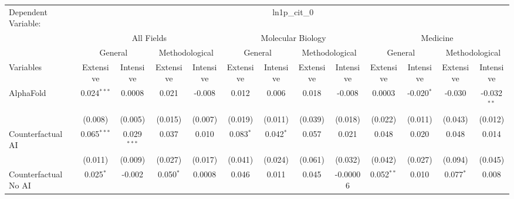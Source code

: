 \begingroup
\centering
\begin{tabular}{lcccccccccccc}
   \tabularnewline \midrule \midrule
   Dependent Variable: & \multicolumn{12}{c}{ln1p\_cit\_0}\\
 & \multicolumn{4}{c}{All Fields} & \multicolumn{4}{c}{Molecular Biology} & \multicolumn{4}{c}{Medicine} \\
\cmidrule(lr){2-5} \cmidrule(lr){6-9} \cmidrule(lr){10-13}
 & \multicolumn{2}{c}{General} & \multicolumn{2}{c}{Methodological} & \multicolumn{2}{c}{General} & \multicolumn{2}{c}{Methodological} & \multicolumn{2}{c}{General} & \multicolumn{2}{c}{Methodological} \\
\cmidrule(lr){2-3} \cmidrule(lr){4-5} \cmidrule(lr){6-7} \cmidrule(lr){8-9} \cmidrule(lr){10-11} \cmidrule(lr){12-13}
Variables & \multicolumn{1}{c}{Extensive} & \multicolumn{1}{c}{Intensive} & \multicolumn{1}{c}{Extensive} & \multicolumn{1}{c}{Intensive} & \multicolumn{1}{c}{Extensive} & \multicolumn{1}{c}{Intensive} & \multicolumn{1}{c}{Extensive} & \multicolumn{1}{c}{Intensive} & \multicolumn{1}{c}{Extensive} & \multicolumn{1}{c}{Intensive} & \multicolumn{1}{c}{Extensive} & \multicolumn{1}{c}{Intensive} \\
\cmidrule(lr){1-1}\cmidrule(lr){2-2} \cmidrule(lr){3-3} \cmidrule(lr){4-4} \cmidrule(lr){5-5} \cmidrule(lr){6-6} \cmidrule(lr){7-7} \cmidrule(lr){8-8} \cmidrule(lr){9-9} \cmidrule(lr){10-10} \cmidrule(lr){11-11} \cmidrule(lr){12-12} \cmidrule(lr){13-13}
   AlphaFold                                & 0.024$^{***}$ & 0.0008        & 0.021       & -0.008  & 0.012       & 0.006          & 0.018        & -0.008         & 0.0003       & -0.020$^{*}$ & -0.030      & -0.032$^{**}$\\   
                                            & (0.008)       & (0.005)       & (0.015)     & (0.007) & (0.019)     & (0.011)        & (0.039)      & (0.018)        & (0.022)      & (0.011)      & (0.043)     & (0.012)\\   
   Counterfactual AI                        & 0.065$^{***}$ & 0.029$^{***}$ & 0.037       & 0.010   & 0.083$^{*}$ & 0.042$^{*}$    & 0.057        & 0.021          & 0.048        & 0.020        & 0.048       & 0.014\\   
                                            & (0.011)       & (0.009)       & (0.027)     & (0.017) & (0.041)     & (0.024)        & (0.061)      & (0.032)        & (0.042)      & (0.027)      & (0.094)     & (0.045)\\   
   Counterfactual No AI                     & 0.025$^{*}$   & -0.002        & 0.050$^{*}$ & 0.0008  & 0.046       & 0.011          & 0.045        & -0.00006       & 0.052$^{**}$ & 0.010        & 0.077$^{*}$ & 0.008\\   

\end{tabular}
